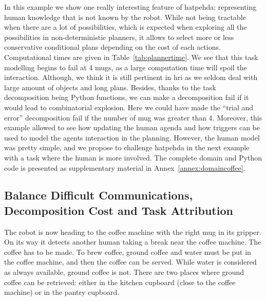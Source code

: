 \documentclass[a4paper,11pt,twoside]{StyleThese}
\begin{document}
In this example we show one really interesting feature of \acrshort{hatpehda}: representing human knowledge that is not known by the robot. While not being tractable when there are a lot of possibilities, which is expected when exploring all the possibilities in non-deterministic planners, it allows to select more or less conservative conditional plans depending on the cost of each actions. Computational times are given in Table~\ref{tab:plannertime}. We see that this task modelling begins to fail at 4 mugs, as a large computation time will spoil the interaction. Although, we think it is still pertinent in \acrshort{hri} as we seldom deal with large amount of objects and long plans. Besides, thanks to the task decomposition being Python functions, we can make a decomposition fail if it would lead to combinatorial explosion. Here we could have made the ``trial and error'' decomposition fail if the number of mug was greater than 4. Moreover, this example allowed to see how updating the human agenda and how triggers can be used to model the agents interaction in the  planning.
However, the human model was pretty simple, and we propose to challenge \acrshort{hatpehda} in the next example with a task where the human is more involved. The complete domain and Python code is presented as supplementary material in Annex~\ref{annex:domaincoffee}.

\subsection{Balance Difficult Communications, Decomposition Cost and Task Attribution}
The robot is now heading to the coffee machine with the right mug in its gripper. On its way it detects another human taking a break near the coffee machine. The coffee has to be made. To brew coffee, ground coffee and water must be put in the coffee machine, and then the coffee can be served. While water is considered as always available, ground coffee is not. There are two places where ground coffee can be retrieved: either in the kitchen cupboard (close to the coffee machine) or in the pantry cupboard. 
\end{document}

